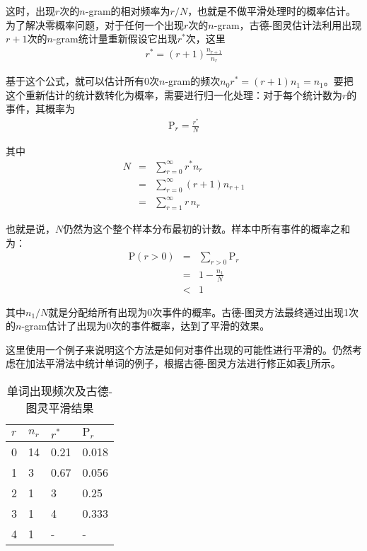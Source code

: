 \parinterval 这时，出现$r$次的$n$-gram的相对频率为$r/N$，也就是不做平滑处理时的概率估计。为了解决零概率问题，对于任何一个出现$r$次的$n$-gram，古德-图灵估计法利用出现$r+1$次的$n$-gram统计量重新假设它出现$r^*$次，这里
\begin{eqnarray}
r^* = (r + 1)\frac{n_{r + 1}}{n_r}
\label{eq:2-29}
\end{eqnarray}

\parinterval 基于这个公式，就可以估计所有0次$n$-gram的频次$n_0 r^*=(r+1)n_1=n_1$。要把这个重新估计的统计数转化为概率，需要进行归一化处理：对于每个统计数为$r$的事件，其概率为
\begin{eqnarray}
\textrm{P}_r=\frac{r^*}{N}
\label{eq:2-30}
\end{eqnarray}

其中
\begin{eqnarray}
N & = & \sum_{r=0}^{\infty}{r^{*}n_r} \nonumber \\
  & = & \sum_{r=0}^{\infty}{(r + 1)n_{r + 1}} \nonumber \\
  & = & \sum_{r=1}^{\infty}{r\,n_r}
\label{eq:2-31}
\end{eqnarray}

也就是说，$N$仍然为这个整个样本分布最初的计数。样本中所有事件的概率之和为：
\begin{eqnarray}
\textrm{P}(r>0) & = & \sum_{r>0}{\textrm{P}_r} \nonumber \\
                & = & 1 - \frac{n_1}{N} \nonumber \\
                & < & 1
\label{eq:2-32}
\end{eqnarray}

\noindent 其中$n_1/N$就是分配给所有出现为0次事件的概率。古德-图灵方法最终通过出现1次的$n$-gram估计了出现为0次的事件概率，达到了平滑的效果。

\parinterval 这里使用一个例子来说明这个方法是如何对事件出现的可能性进行平滑的。仍然考虑在加法平滑法中统计单词的例子，根据古德-图灵方法进行修正如表\ref{tab:2-21}所示。

\begin{table}[htp]{
\begin{center}
\caption{单词出现频次及古德-图灵平滑结果}
{
\begin{tabular}{l|lll}
\rule{0pt}{10pt} $r$ & $n_r$ & $r^*$ & $\textrm{P}_r$\\ \hline
\rule{0pt}{10pt} 0 & 14 & 0.21 & 0.018 \\
\rule{0pt}{10pt} 1 & 3 & 0.67 & 0.056 \\
\rule{0pt}{10pt} 2 & 1 & 3 & 0.25 \\
\rule{0pt}{10pt} 3 & 1 & 4 & 0.333 \\
\rule{0pt}{10pt} 4 & 1 & - & - \\
\end{tabular}
\label{tab:2-21}
}
\end{center}
}\end{table}

